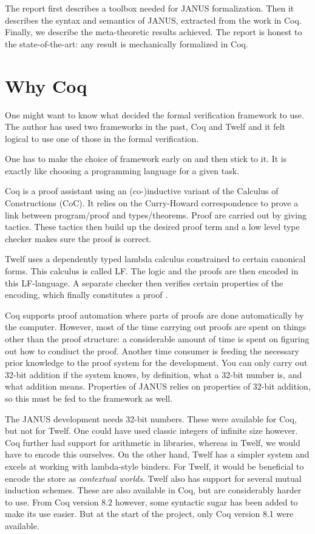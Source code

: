 The report first describes a toolbox needed for JANUS
formalization. Then it describes the syntax and semantics of JANUS,
extracted from the work in Coq. Finally, we describe the
meta-theoretic results achieved. The report is honest to the
state-of-the-art: any result is mechanically formalized in Coq.

\section{Why Coq}

One might want to know what decided the formal verification framework
to use. The author has used two frameworks in the past, Coq and Twelf
and it felt logical to use one of those in the formal verification.

One has to make the choice of framework early on and then stick to
it. It is exactly like choosing a programming language for a given
task.

Coq is a proof assistant using an (co-)inductive variant of the
Calculus of Constructions (CoC). It relies on the Curry-Howard
correspondence to prove a link between program/proof and
types/theorems. Proof are carried out by giving tactics. These tactics
then build up the desired proof term and a low level type checker
makes sure the proof is correct.

Twelf uses a dependently typed lambda calculus constrained to certain
canonical forms. This calculus is called LF. The logic and the proofs
are then encoded in this LF-language. A separate checker then verifies
certain properties of the encoding, which finally constitutes a proof
.

Coq supports proof automation where parts of proofs are done
automatically by the computer. However, most of the time carrying out
proofs are spent on things other than the proof structure: a
considerable amount of time is spent on figuring out how to condiuct
the proof. Another time consumer is feeding the necessary prior
knowledge to the proof system for the development. You can only carry
out 32-bit addition if the system knows, by definition, what a 32-bit
number is, and what addition means. Properties of JANUS relies on
properties of 32-bit addition, so this must be fed to the framework as
well.

The JANUS development needs 32-bit numbers. These were available
for Coq, but not for Twelf. One could have used classic integers of
infinite size however. Coq further had support for arithmetic in
libraries, whereas in Twelf, we would have to encode this
ourselves. On the other hand, Twelf has a simpler system and excels at
working with lambda-style binders. For Twelf, it would be beneficial
to encode the store as \emph{contextual worlds}. Twelf also has
support for several mutual induction schemes. These are also available
in Coq, but are considerably harder to use. From Coq version 8.2
however, some syntactic sugar has been added to make its use
easier. But at the start of the project, only Coq version 8.1 were
available.


